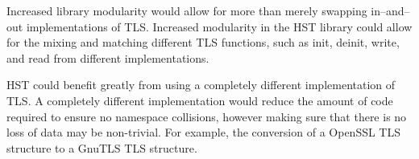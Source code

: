 \documentclass{acm_proc_article-sp}
\begin{document}
Increased library modularity would allow for more than merely swapping
in--and--out implementations of TLS. Increased modularity in the HST library
could allow for the mixing and matching different TLS functions, such as init,
deinit, write, and read from different implementations.

HST could benefit greatly from using a completely different implementation of
TLS. A completely different implementation would reduce the amount of code
required to ensure no namespace collisions, however making sure that there is no
loss of data may be non-trivial. For example, the conversion of a OpenSSL TLS
structure to a GnuTLS TLS structure.




\balancecolumns
\end{document}

